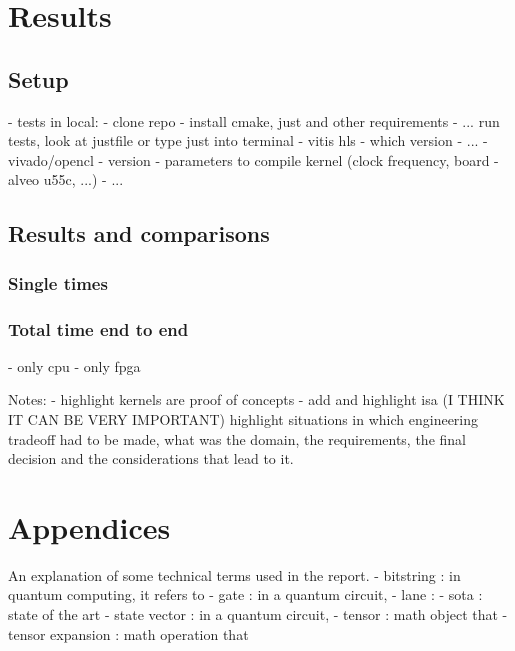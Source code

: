 \documentclass[12pt,oneside,a4paper]{article}
\begin{document}

\section{Results}

\subsection{Setup}
- tests in local:
	- clone repo
	- install cmake, just and other requirements
	- ... run tests, look at justfile or type just into terminal
- vitis hls
	- which version
	- ...
- vivado/opencl
	- version
	- parameters to compile kernel (clock frequency, board - alveo u55c, ...)
	- ...

\subsection{Results and comparisons}

\subsubsection{Single times}
\subsubsection{Total time end to end}
	- only cpu
	- only fpga

Notes:
	- highlight kernels are proof of concepts
	- add and highlight isa
	(I THINK IT CAN BE VERY IMPORTANT) highlight situations in which engineering tradeoff had to be made, what was the domain, the requirements, the final decision and the considerations that lead to it.






\printbibliography[title={\section{References}}]

\section{Appendices}
An explanation of some technical terms used in the report.
- bitstring : in quantum computing, it refers to
- gate : in a quantum circuit,
- lane :
- sota : state of the art
- state vector : in a quantum circuit,
- tensor : math object that
- tensor expansion : math operation that
\end{document}
